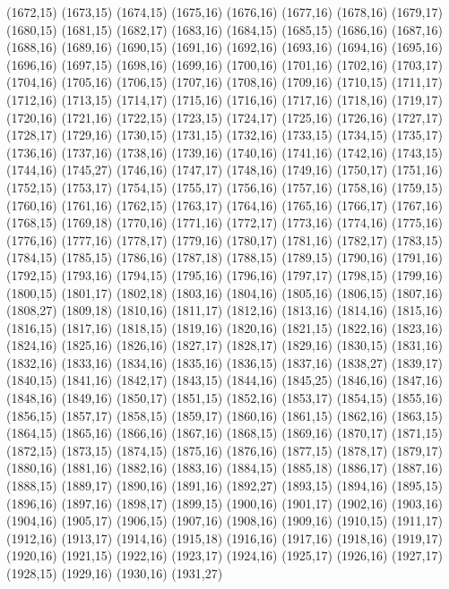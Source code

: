 (1672,15)
(1673,15)
(1674,15)
(1675,16)
(1676,16)
(1677,16)
(1678,16)
(1679,17)
(1680,15)
(1681,15)
(1682,17)
(1683,16)
(1684,15)
(1685,15)
(1686,16)
(1687,16)
(1688,16)
(1689,16)
(1690,15)
(1691,16)
(1692,16)
(1693,16)
(1694,16)
(1695,16)
(1696,16)
(1697,15)
(1698,16)
(1699,16)
(1700,16)
(1701,16)
(1702,16)
(1703,17)
(1704,16)
(1705,16)
(1706,15)
(1707,16)
(1708,16)
(1709,16)
(1710,15)
(1711,17)
(1712,16)
(1713,15)
(1714,17)
(1715,16)
(1716,16)
(1717,16)
(1718,16)
(1719,17)
(1720,16)
(1721,16)
(1722,15)
(1723,15)
(1724,17)
(1725,16)
(1726,16)
(1727,17)
(1728,17)
(1729,16)
(1730,15)
(1731,15)
(1732,16)
(1733,15)
(1734,15)
(1735,17)
(1736,16)
(1737,16)
(1738,16)
(1739,16)
(1740,16)
(1741,16)
(1742,16)
(1743,15)
(1744,16)
(1745,27)
(1746,16)
(1747,17)
(1748,16)
(1749,16)
(1750,17)
(1751,16)
(1752,15)
(1753,17)
(1754,15)
(1755,17)
(1756,16)
(1757,16)
(1758,16)
(1759,15)
(1760,16)
(1761,16)
(1762,15)
(1763,17)
(1764,16)
(1765,16)
(1766,17)
(1767,16)
(1768,15)
(1769,18)
(1770,16)
(1771,16)
(1772,17)
(1773,16)
(1774,16)
(1775,16)
(1776,16)
(1777,16)
(1778,17)
(1779,16)
(1780,17)
(1781,16)
(1782,17)
(1783,15)
(1784,15)
(1785,15)
(1786,16)
(1787,18)
(1788,15)
(1789,15)
(1790,16)
(1791,16)
(1792,15)
(1793,16)
(1794,15)
(1795,16)
(1796,16)
(1797,17)
(1798,15)
(1799,16)
(1800,15)
(1801,17)
(1802,18)
(1803,16)
(1804,16)
(1805,16)
(1806,15)
(1807,16)
(1808,27)
(1809,18)
(1810,16)
(1811,17)
(1812,16)
(1813,16)
(1814,16)
(1815,16)
(1816,15)
(1817,16)
(1818,15)
(1819,16)
(1820,16)
(1821,15)
(1822,16)
(1823,16)
(1824,16)
(1825,16)
(1826,16)
(1827,17)
(1828,17)
(1829,16)
(1830,15)
(1831,16)
(1832,16)
(1833,16)
(1834,16)
(1835,16)
(1836,15)
(1837,16)
(1838,27)
(1839,17)
(1840,15)
(1841,16)
(1842,17)
(1843,15)
(1844,16)
(1845,25)
(1846,16)
(1847,16)
(1848,16)
(1849,16)
(1850,17)
(1851,15)
(1852,16)
(1853,17)
(1854,15)
(1855,16)
(1856,15)
(1857,17)
(1858,15)
(1859,17)
(1860,16)
(1861,15)
(1862,16)
(1863,15)
(1864,15)
(1865,16)
(1866,16)
(1867,16)
(1868,15)
(1869,16)
(1870,17)
(1871,15)
(1872,15)
(1873,15)
(1874,15)
(1875,16)
(1876,16)
(1877,15)
(1878,17)
(1879,17)
(1880,16)
(1881,16)
(1882,16)
(1883,16)
(1884,15)
(1885,18)
(1886,17)
(1887,16)
(1888,15)
(1889,17)
(1890,16)
(1891,16)
(1892,27)
(1893,15)
(1894,16)
(1895,15)
(1896,16)
(1897,16)
(1898,17)
(1899,15)
(1900,16)
(1901,17)
(1902,16)
(1903,16)
(1904,16)
(1905,17)
(1906,15)
(1907,16)
(1908,16)
(1909,16)
(1910,15)
(1911,17)
(1912,16)
(1913,17)
(1914,16)
(1915,18)
(1916,16)
(1917,16)
(1918,16)
(1919,17)
(1920,16)
(1921,15)
(1922,16)
(1923,17)
(1924,16)
(1925,17)
(1926,16)
(1927,17)
(1928,15)
(1929,16)
(1930,16)
(1931,27)
